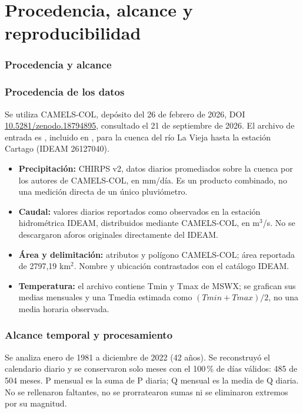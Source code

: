 \documentclass[10pt,a4paper]{article}
\begin{document}
\section*{Procedencia, alcance y reproducibilidad}
\subsubsection*{Procedencia y alcance}
\subsubsection*{Procedencia de los datos}
Se utiliza CAMELS-COL, depósito del 26 de febrero de 2026, DOI
\href{https://doi.org/10.5281/zenodo.18794895}{10.5281/zenodo.18794895}, consultado
el 21 de septiembre de 2026. El archivo de entrada es
, incluido en
, para la cuenca del río
La Vieja hasta la estación Cartago (IDEAM 26127040).
\begin{itemize}
\item \textbf{Precipitación:} CHIRPS v2, datos diarios promediados sobre la cuenca
por los autores de CAMELS-COL, en mm/día. Es un producto combinado, no una
medición directa de un único pluviómetro.
\item \textbf{Caudal:} valores diarios reportados como observados en la estación
hidrométrica IDEAM, distribuidos mediante CAMELS-COL, en m$^3$/s. No se
descargaron aforos originales directamente del IDEAM.
\item \textbf{Área y delimitación:} atributos y polígono CAMELS-COL; área
reportada de 2797,19 km$^2$. Nombre y ubicación contrastados con el catálogo IDEAM.
\item \textbf{Temperatura:} el archivo contiene Tmin y Tmax de MSWX; se grafican sus medias mensuales y una Tmedia estimada como $(Tmin+Tmax)/2$, no una media horaria observada.
\end{itemize}

\subsubsection*{Alcance temporal y procesamiento}
Se analiza enero de 1981 a diciembre de 2022 (42 años). Se reconstruyó el
calendario diario y se conservaron solo meses con el 100\,\% de días válidos:
485 de 504 meses. P mensual es la suma de P diaria; Q mensual es la media de Q
diaria. No se rellenaron faltantes, no se prorratearon sumas ni se eliminaron
extremos por su magnitud.
\end{document}
